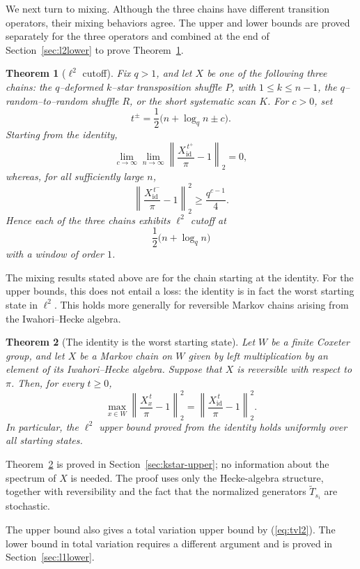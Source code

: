 \documentclass[11pt]{article}
\theoremstyle{plain}  %
\newtheorem{theorem}{Theorem}[section]
\begin{document}
We next turn to mixing. Although the three chains have different transition operators, their mixing behaviors agree. The upper and lower bounds are proved separately for the three operators and combined at the end of Section~\ref{sec:l2lower} to prove Theorem~\ref{T-l2cutoff}.
\begin{theorem}[$\ell^{2}$ cutoff]\label{T-l2cutoff}
Fix $q>1$, and let $X$ be one of the following three chains: the
$q$--deformed $k$--star transposition shuffle $P$, with
$1\leq k\leq n-1$, the $q$--random--to--random shuffle $R$, or the short
systematic scan $K$. For $c>0$, set
\[
    t^\pm
    =
    \frac12\bigl(n+\log_q n\pm c\bigr).
\]
Starting from the identity,
\[
\lim_{c\to\infty}\lim_{n\to\infty}
\left\|
    \frac{X_{\mathrm{id}}^{\,t^+}}{\pi}-1
\right\|_2
=0,
\]
whereas, for all sufficiently large $n$,
\[
\left\|
    \frac{X_{\mathrm{id}}^{\,t^-}}{\pi}-1
\right\|_2^2
\geq
\frac{q^{c-1}}{4}.
\]
Hence each of the three chains exhibits $\ell^2$ cutoff at
\[
    \frac12\bigl(n+\log_q n\bigr)
\]
with a window of order $1$.
\end{theorem}

The mixing results stated above are for the chain starting at the identity.
For the upper bounds, this does not entail a loss: the identity is in fact the worst
starting state in $\ell^2$. This holds more generally for reversible Markov
chains arising from the Iwahori--Hecke algebra.

\begin{theorem}[The identity is the worst starting state]\label{T-worst}
Let $W$ be a finite Coxeter group, and let $X$ be a Markov chain on $W$ given
by left multiplication by an element of its Iwahori--Hecke algebra. Suppose
that $X$ is reversible with respect to $\pi$. Then, for every $t\geq0$,
\[
    \max_{x\in W}
    \left\|
        \frac{X_x^{\,t}}{\pi}-1
    \right\|_2^2
    =
    \left\|
        \frac{X_{\mathrm{id}}^{\,t}}{\pi}-1
    \right\|_2^2.
\]
In particular, the $\ell^2$ upper bound proved from the identity holds
uniformly over all starting states.
\end{theorem}

Theorem~\ref{T-worst} is proved in
Section~\ref{sec:kstar-upper}; no information about the spectrum of $X$ is
needed. The proof uses only the Hecke-algebra structure, together with
reversibility and the fact that the normalized generators
$\widetilde T_{s_i}$ are stochastic.

The upper bound also gives a total variation upper bound by (\ref{eq:tvl2}).
The lower bound in total variation requires a different argument and is proved in Section~\ref{sec:l1lower}.
\end{document}

